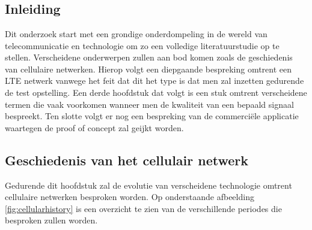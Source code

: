 \chapter{}%
\label{ch:stand-van-zaken}



\section{Inleiding}

Dit onderzoek start met een grondige onderdompeling in de wereld van telecommunicatie en technologie om zo een volledige literatuurstudie op te stellen. Verscheidene onderwerpen zullen aan bod komen zoals de geschiedenis van cellulaire netwerken. Hierop volgt een diepgaande bespreking omtrent een LTE netwerk vanwege het feit dat dit het type is dat men zal inzetten gedurende de test opstelling. Een derde hoofdstuk dat volgt is een stuk omtrent verscheidene termen die vaak voorkomen wanneer men de kwaliteit van een bepaald signaal bespreekt. Ten slotte volgt er nog een bespreking van de commerciële applicatie waartegen de proof of concept zal geijkt worden.

\pagebreak

\section{Geschiedenis van het cellulair netwerk}

Gedurende dit hoofdstuk zal de evolutie van verscheidene technologie omtrent cellulaire netwerken besproken worden. Op onderstaande afbeelding \ref{fig:cellularhistory} is een overzicht te zien van de verschillende periodes die besproken zullen worden.

